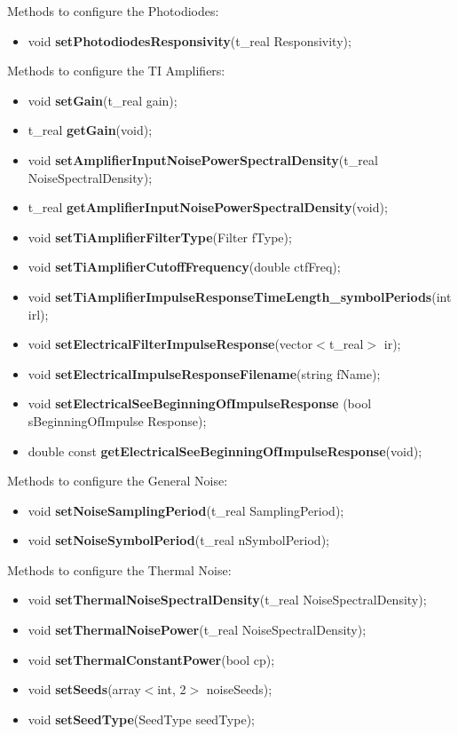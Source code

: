 Methods to configure the Photodiodes:
\begin{itemize}
     \item void  \textbf{setPhotodiodesResponsivity}(t\_real Responsivity);
\end{itemize}


Methods to configure the TI Amplifiers:
\begin{itemize}
     \item void \textbf{setGain}(t\_real gain);
     \item t\_real \textbf{getGain}(void);
     \item void \textbf{setAmplifierInputNoisePowerSpectralDensity}(t\_real NoiseSpectralDensity);
     \item t\_real \textbf{getAmplifierInputNoisePowerSpectralDensity}(void);
     \item void \textbf{setTiAmplifierFilterType}(Filter fType);
     \item void \textbf{setTiAmplifierCutoffFrequency}(double ctfFreq);
     \item void \textbf{setTiAmplifierImpulseResponseTimeLength\_symbolPeriods}(int irl);
     \item void \textbf{setElectricalFilterImpulseResponse}(vector$<$t\_real$>$ ir);
     \item void \textbf{setElectricalImpulseResponseFilename}(string fName);
     \item void \textbf{setElectricalSeeBeginningOfImpulseResponse} (bool sBeginningOfImpulse Response);
     \item  double const \textbf{getElectricalSeeBeginningOfImpulseResponse}(void);
\end{itemize}


Methods to configure the General Noise:
\begin{itemize}
     \item void \textbf{setNoiseSamplingPeriod}(t\_real SamplingPeriod);
     \item void \textbf{setNoiseSymbolPeriod}(t\_real nSymbolPeriod);
\end{itemize}


Methods to configure the Thermal Noise:
\begin{itemize}
     \item void \textbf{setThermalNoiseSpectralDensity}(t\_real NoiseSpectralDensity);
     \item void \textbf{setThermalNoisePower}(t\_real NoiseSpectralDensity);
     \item void \textbf{setThermalConstantPower}(bool cp);
     \item void \textbf{setSeeds}(array$<$int, 2$>$ noiseSeeds);
     \item void \textbf{setSeedType}(SeedType seedType);
\end{itemize}


